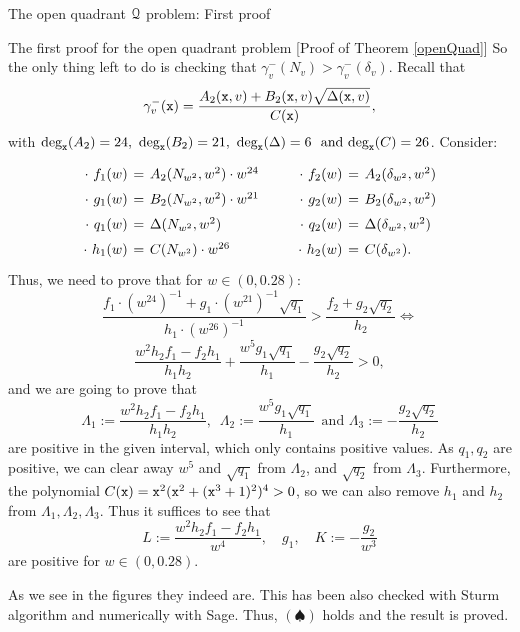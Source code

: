 \documentclass[11pt, a4paper, english, twoside, notitlepage, openright]{report}
\begin{document}
\begin{chapter}{The open quadrant $\mathcal{Q}$ problem: First proof}
\begin{section}{The first proof for the open quadrant problem} [Proof of Theorem \ref{openQuad}]
So the only thing left to do is checking that $\gamma_v^-(N_v)>\gamma_v^-(\delta_v)$. Recall that 
$$
\gamma_v^-({\tt x})=\dfrac{A_2({\tt x},v)+B_2({\tt x},v)\sqrt{\Delta({\tt x},v)}}{C({\tt x})},
$$
with $\text{deg}_{\tt x}(A_2)=24,\, \, \text{deg}_{\tt x}(B_2)=21,\, \, \text{deg}_{\tt x}(\Delta)=6\, \, \text{ and }\text{deg}_{\tt x}(C)=26$. Consider:
$$
\arraycolsep=2pt\def\arraystretch{1.5}
\begin{array}{rclcrcl}
\cdot\ f_1(w)&=&A_2(N_{w^2},w^2)\cdot w^{24}& \qquad &\cdot\ f_2(w)&=& A_2(\delta_{w^2},w^2)\\
\cdot\ g_1(w)&=&B_2(N_{w^2},w^2)\cdot w^{21}& \qquad &\cdot\ g_2(w)&=&B_2(\delta_{w^2},w^2)\\
\cdot\ q_1(w)&=&\Delta(N_{w^2},w^2)& \qquad &\cdot\ q_2(w)&=&\Delta(\delta_{w^2},w^2)\\
\cdot\ h_1(w)&=&C(N_{w^2})\cdot w^{26}& \qquad &\cdot\ h_2(w)&=&C(\delta_{w^2}).
\end{array}
$$
Thus, we need to prove that for $w\in(0,0.28)$:
$$
\frac{f_1\cdot(w^{24})^{-1}+g_1\cdot (w^{21})^{-1}\sqrt{q_1}}{h_1\cdot(w^{26})^{-1}}>\frac{f_2+g_2\sqrt{q_2}}{h_2} \iff
$$
$$
\frac{w^2h_2f_1-f_2h_1}{h_1h_2}+\frac{w^5g_1\sqrt{q_1}}{h_1}-\frac{g_2\sqrt{q_2}}{h_2}>0,
$$
and we are going to prove that 
$$
\Lambda_1:= \frac{w^2h_2f_1-f_2h_1}{h_1h_2},\, \, \, \Lambda_2:=\frac{w^5g_1\sqrt{q_1}}{h_1} \, \text{ and } \Lambda_3 := -\frac{g_2\sqrt{q_2}}{h_2}
$$
are positive in the given interval, which only contains positive values. As $q_1,q_2$ are positive, we can clear away $w^5$ and $\sqrt{q_1}$ from $\Lambda_2$, and $\sqrt{q_2}$ from $\Lambda_3$. Furthermore, the polynomial $C({\tt x})={\tt x}^2({\tt x}^2+({\tt x}^3+1)^2)^4>0$, so we can also remove $h_1$ and $h_2$ from $\Lambda_1,\Lambda_2, \Lambda_3$. Thus it suffices to see that
$$
L:=\frac{w^2h_2f_1-f_2h_1}{w^4},\quad g_1,\quad K:=-\frac{g_2}{w^3}
$$ 
are positive for $w\in(0,0.28)$.

\vspace{2cm}

As we see in the figures they indeed are. This has been also checked with Sturm algorithm and numerically with Sage. Thus, $(\spadesuit)$ holds and the result is proved.


\end{section}
\end{chapter}
\end{document}
